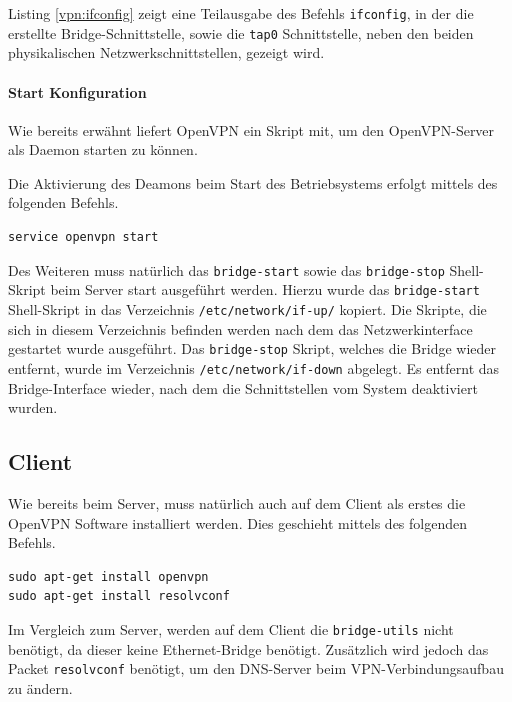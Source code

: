 

Listing \ref{vpn:ifconfig} zeigt eine Teilausgabe des Befehls \texttt{ifconfig}, in der die erstellte Bridge-Schnittstelle, sowie die \texttt{tap0} Schnittstelle, neben den beiden physikalischen Netzwerkschnittstellen, gezeigt wird.

\paragraph{Start Konfiguration}

Wie bereits erwähnt liefert OpenVPN ein Skript mit, um den OpenVPN-Server als Daemon starten zu können.

Die Aktivierung des Deamons beim Start des Betriebsystems erfolgt mittels des folgenden Befehls.

\begin{lstlisting}
service openvpn start
\end{lstlisting}

Des Weiteren muss natürlich das \texttt{bridge-start} sowie das \texttt{bridge-stop} Shell-Skript beim Server start ausgeführt werden. 
Hierzu wurde das \texttt{bridge-start} Shell-Skript in das Verzeichnis \texttt{/etc/network/if-up/} kopiert. Die Skripte, die sich in diesem Verzeichnis befinden werden nach dem das Netzwerkinterface gestartet wurde ausgeführt. Das \texttt{bridge-stop} Skript, welches die Bridge wieder entfernt, wurde im Verzeichnis \texttt{/etc/network/if-down} abgelegt. Es entfernt das Bridge-Interface wieder, nach dem die Schnittstellen vom System deaktiviert wurden.

\subsection{Client}\label{vpn:client}

Wie bereits beim Server, muss natürlich auch auf dem Client als erstes die OpenVPN Software installiert werden. Dies geschieht mittels des folgenden Befehls.

\begin{lstlisting}
sudo apt-get install openvpn
sudo apt-get install resolvconf
\end{lstlisting}

Im Vergleich zum Server, werden auf dem Client die \texttt{bridge-utils} nicht benötigt, da dieser keine Ethernet-Bridge benötigt. Zusätzlich wird jedoch das Packet \texttt{resolvconf} benötigt, um den DNS-Server beim VPN-Verbindungsaufbau zu ändern.

